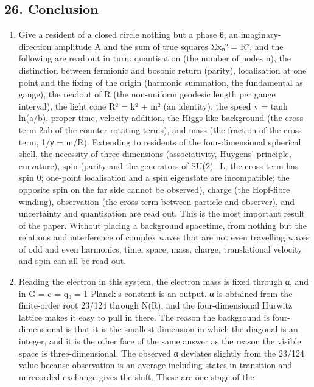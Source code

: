 \documentclass[
  a4paper,
]{article}
\providecommand{\tightlist}{%
  \setlength{\itemsep}{0pt}\setlength{\parskip}{0pt}}
\begin{document}
\subsection{26. Conclusion}\label{conclusion}

\begin{enumerate}
\def\labelenumi{\arabic{enumi}.}
\tightlist
\item
  Give a resident of a closed circle nothing but a phase θ, an
  imaginary-direction amplitude A and the sum of true squares Σxₙ² = R²,
  and the following are read out in turn: quantisation (the number of
  nodes n), the distinction between fermionic and bosonic return
  (parity), localisation at one point and the fixing of the origin
  (harmonic summation, the fundamental as gauge), the readout of R (the
  non-uniform geodesic length per gauge interval), the light cone R² =
  k² + m² (an identity), the speed v = tanh ln(a/b), proper time,
  velocity addition, the Higgs-like background (the cross term 2ab of
  the counter-rotating terms), and mass (the fraction of the cross term,
  1/γ = m/R). Extending to residents of the four-dimensional spherical
  shell, the necessity of three dimensions (associativity, Huygens'
  principle, curvature), spin (parity and the generators of SU(2)\_L;
  the cross term has spin 0; one-point localisation and a spin
  eigenstate are incompatible; the opposite spin on the far side cannot
  be observed), charge (the Hopf-fibre winding), observation (the cross
  term between particle and observer), and uncertainty and quantisation
  are read out. This is the most important result of the paper. Without
  placing a background spacetime, from nothing but the relations and
  interference of complex waves that are not even travelling waves of
  odd and even harmonics, time, space, mass, charge, translational
  velocity and spin can all be read out.
\item
  Reading the electron in this system, the electron mass is fixed
  through α, and in G = c = q₀ = 1 Planck's constant is an output. α is
  obtained from the finite-order root 23/124 through N(R), and the
  four-dimensional Hurwitz lattice makes it easy to pull in there. The
  reason the background is four-dimensional is that it is the smallest
  dimension in which the diagonal is an integer, and it is the other
  face of the same answer as the reason the visible space is
  three-dimensional. The observed α deviates slightly from the 23/124
  value because observation is an average including states in transition
  and unrecorded exchange gives the shift. These are one stage of the

\end{enumerate}
\end{document}
